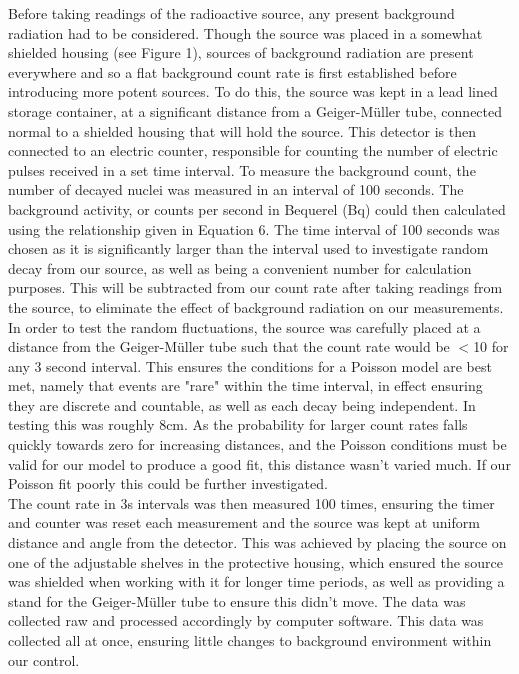 \documentclass[11pt]{article}
\begin{document}
    Before taking readings of the radioactive source, any present background radiation had to be considered. Though the source was placed in a somewhat shielded housing (see Figure 1), sources of background radiation are present everywhere and so a flat background count rate is first established before introducing more potent sources. To do this, the source was kept in a lead lined storage container, at a significant distance from a Geiger-Müller tube, connected normal to a shielded housing that will hold the source. This detector is then connected to an electric counter, responsible for counting the number of electric pulses received in a set time interval. To measure the background count, the number of decayed nuclei was measured in an interval of 100 seconds. The background activity, or counts per second in Bequerel (Bq) could then calculated using the relationship given in Equation 6. The time interval of 100 seconds was chosen as it is significantly larger than the interval used to investigate random decay from our source, as well as being a convenient number for calculation purposes. This will be subtracted from our count rate after taking readings from the source, to eliminate the effect of background radiation on our measurements. \newline
    In order to test the random fluctuations, the  source was carefully placed at a distance from the Geiger-Müller tube such that the count rate would be $<$10 for any 3 second interval. This ensures the conditions for a Poisson model are best met, namely that events are "rare" within the time interval, in effect ensuring they are discrete and countable, as well as each decay being independent. In testing this was roughly 8cm. As the probability for larger count rates falls quickly towards zero for increasing distances, and the Poisson conditions must be valid for our model to produce a good fit, this distance wasn't varied much. If our Poisson fit poorly this could be further investigated.  \\
    The count rate in 3s intervals was then measured 100 times, ensuring the timer and counter was reset each measurement and the source was kept at uniform distance and angle from the detector. This was achieved by placing the source on one of the adjustable shelves in the protective housing, which ensured the source was shielded when working with it for longer time periods, as well as providing a stand for the Geiger-Müller tube to ensure this didn't move. The data was collected raw and processed accordingly by computer software. This data was collected all at once, ensuring little changes to background environment within our control. 
\end{document}
